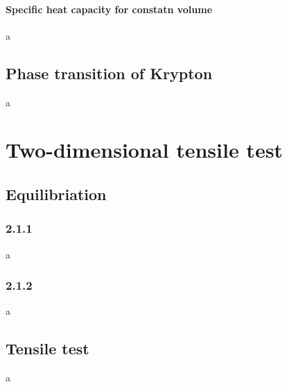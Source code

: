 \documentclass[10pt,a4paper]{report}
\begin{document}
\subsubsection{Specific heat capacity for constatn volume}
a

\section{Phase transition of Krypton}
a


\chapter{Two-dimensional tensile test}
\section{Equilibriation}
\subsection{2.1.1}
a
\subsection{2.1.2}
a

\section{Tensile test}
a
\end{document}
